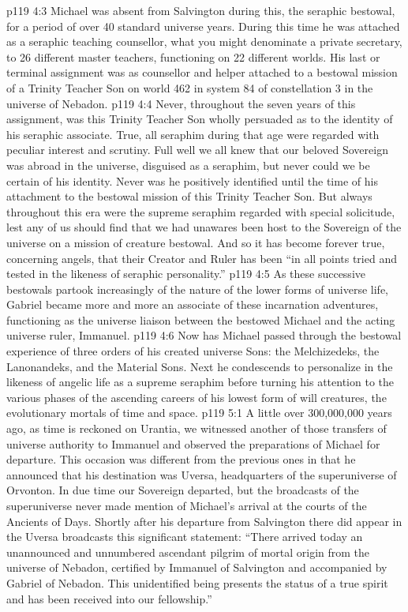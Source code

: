 \vs p119 4:3 Michael was absent from Salvington during this, the seraphic bestowal, for a period of over 40 standard universe years. During this time he was attached as a seraphic teaching counsellor, what you might denominate a private secretary, to 26 different master teachers, functioning on 22 different worlds. His last or terminal assignment was as counsellor and helper attached to a bestowal mission of a Trinity Teacher Son on world 462 in system 84 of constellation 3 in the universe of Nebadon.
\vs p119 4:4 Never, throughout the seven years of this assignment, was this Trinity Teacher Son wholly persuaded as to the identity of his seraphic associate. True, all seraphim during that age were regarded with peculiar interest and scrutiny. Full well we all knew that our beloved Sovereign was abroad in the universe, disguised as a seraphim, but never could we be certain of his identity. Never was he positively identified until the time of his attachment to the bestowal mission of this Trinity Teacher Son. But always throughout this era were the supreme seraphim regarded with special solicitude, lest any of us should find that we had unawares been host to the Sovereign of the universe on a mission of creature bestowal. And so it has become forever true, concerning angels, that their Creator and Ruler has been “in all points tried and tested in the likeness of seraphic personality.”
\vs p119 4:5 As these successive bestowals partook increasingly of the nature of the lower forms of universe life, Gabriel became more and more an associate of these incarnation adventures, functioning as the universe liaison between the bestowed Michael and the acting universe ruler, Immanuel.
\vs p119 4:6 \pc Now has Michael passed through the bestowal experience of three orders of his created universe Sons: the Melchizedeks, the Lanonandeks, and the Material Sons. Next he condescends to personalize in the likeness of angelic life as a supreme seraphim before turning his attention to the various phases of the ascending careers of his lowest form of will creatures, the evolutionary mortals of time and space.
\vs p119 5:1 A little over 300,000,000 years ago, as time is reckoned on Urantia, we witnessed another of those transfers of universe authority to Immanuel and observed the preparations of Michael for departure. This occasion was different from the previous ones in that he announced that his destination was Uversa, headquarters of the superuniverse of Orvonton. In due time our Sovereign departed, but the broadcasts of the superuniverse never made mention of Michael’s arrival at the courts of the Ancients of Days. Shortly after his departure from Salvington there did appear in the Uversa broadcasts this significant statement: “There arrived today an unannounced and unnumbered ascendant pilgrim of mortal origin from the universe of Nebadon, certified by Immanuel of Salvington and accompanied by Gabriel of Nebadon. This unidentified being presents the status of a true spirit and has been received into our fellowship.”
